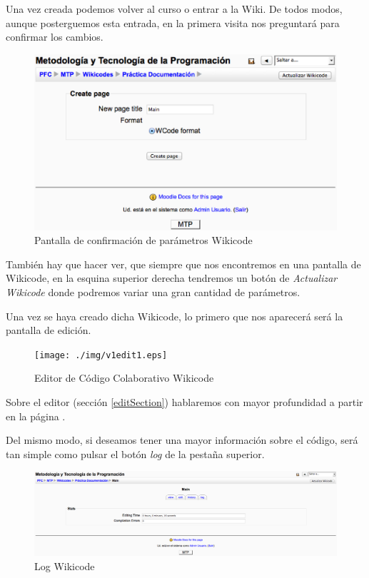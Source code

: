 \newpage

Una vez creada podemos volver al curso o entrar a la Wiki. De todos modos, aunque posterguemos esta entrada, en la primera visita nos preguntará para confirmar los cambios. 

\vspace{2cm}

\begin{figure}[h]
	\label{v1create2.eps}
	\includegraphics[width=\textwidth]{./img/v1create2.eps}
	\caption{Pantalla de confirmación de parámetros Wikicode}
\end{figure}

También hay que hacer ver, que siempre que nos encontremos en una pantalla de Wikicode, en la esquina superior derecha tendremos un botón de \emph{Actualizar Wikicode} donde podremos variar una gran cantidad de parámetros.

\newpage

Una vez se haya creado dicha Wikicode, lo primero que nos aparecerá será la pantalla de edición.

\begin{figure}[h]
	\label{v1edit1.eps}
	\texttt{[image: ./img/v1edit1.eps]}
	\caption{Editor de Código Colaborativo Wikicode}
\end{figure}

Sobre el editor (sección \ref{editSection}) hablaremos con mayor profundidad a partir en la página \pageref{editSection}.

Del mismo modo, si deseamos tener una mayor información sobre el código, será tan simple como pulsar el botón \emph{log} de la pestaña superior.

\begin{figure}[h]
	\label{v1log.eps}
	\includegraphics[width=\textwidth]{./img/v1log.eps}
	\caption{Log Wikicode}
\end{figure}

